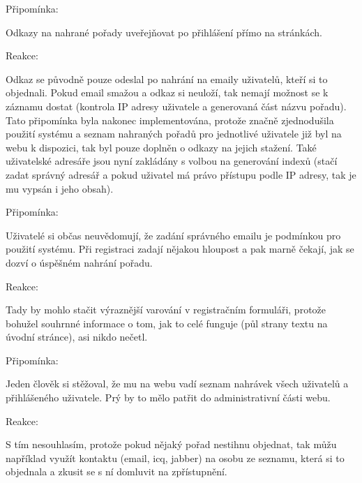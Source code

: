 \vspace{10pt}
 
\begin{bf}Připomínka:\end{bf} Odkazy na nahrané pořady uveřejňovat po přihlášení přímo na stránkách. 

\begin{bf}Reakce:\end{bf} Odkaz se původně pouze odeslal po nahrání na emaily uživatelů, kteří si to objednali. Pokud email smažou a odkaz si neuloží, tak nemají možnost se k záznamu dostat (kontrola IP adresy uživatele a generovaná část názvu pořadu). Tato připomínka byla nakonec implementována, protože značně zjednodušila použití systému a seznam nahraných pořadů pro jednotlivé uživatele již byl na webu k dispozici, tak byl pouze doplněn o odkazy na jejich stažení. Také uživatelské adresáře jsou nyní zakládány s volbou na generování indexů (stačí zadat správný adresář a pokud uživatel má právo přístupu podle IP adresy, tak je mu vypsán i jeho obsah).

\vspace{10pt}

\begin{bf}Připomínka:\end{bf} Uživatelé si občas neuvědomují, že zadání správného emailu je podmínkou pro použití systému. Při registraci zadají nějakou hloupost a pak marně čekají, jak se dozví o úspěšném nahrání pořadu.

\begin{bf}Reakce:\end{bf} Tady by mohlo stačit výraznější varování v registračním formuláři, protože bohužel souhrnné informace o tom, jak to celé funguje (půl strany textu na úvodní stránce), asi nikdo nečetl.

\vspace{10pt}

\begin{bf}Připomínka:\end{bf} Jeden člověk si stěžoval, že mu na webu vadí seznam nahrávek všech uživatelů a přihlášeného uživatele. Prý by to mělo patřit do administrativní části webu.

\begin{bf}Reakce:\end{bf} S tím nesouhlasím, protože pokud nějaký pořad nestihnu objednat, tak můžu například využít kontaktu (email, icq, jabber) na osobu ze seznamu, která si to objednala a zkusit se s ní domluvit na zpřístupnění.

